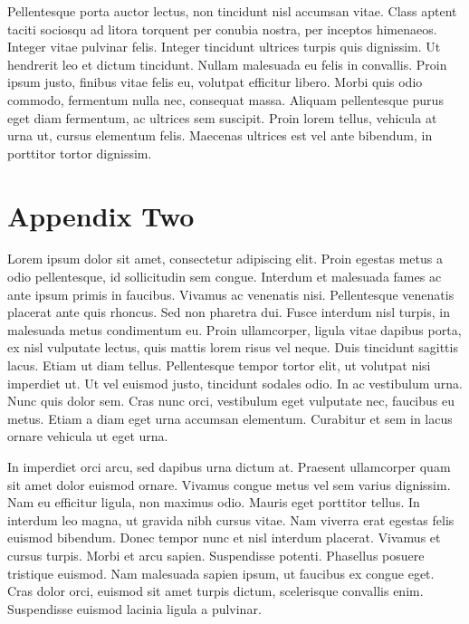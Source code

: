 \documentclass[12pt]{article}
\begin{document}
Pellentesque porta auctor lectus, non tincidunt nisl accumsan vitae. Class aptent taciti sociosqu ad litora torquent per conubia nostra, per inceptos himenaeos. Integer vitae pulvinar felis. Integer tincidunt ultrices turpis quis dignissim. Ut hendrerit leo et dictum tincidunt. Nullam malesuada eu felis in convallis. Proin ipsum justo, finibus vitae felis eu, volutpat efficitur libero. Morbi quis odio commodo, fermentum nulla nec, consequat massa. Aliquam pellentesque purus eget diam fermentum, ac ultrices sem suscipit. Proin lorem tellus, vehicula at urna ut, cursus elementum felis. Maecenas ultrices est vel ante bibendum, in porttitor tortor dignissim.



\newpage
\section{Appendix Two
\label{sec:appendix:two}}
\renewcommand{\thetable}{C\arabic{table}}
\setcounter{table}{0}
\renewcommand{\thefigure}{C\arabic{figure}}
\setcounter{figure}{0}

Lorem ipsum dolor sit amet, consectetur adipiscing elit. Proin egestas metus a odio pellentesque, id sollicitudin sem congue. Interdum et malesuada fames ac ante ipsum primis in faucibus. Vivamus ac venenatis nisi. Pellentesque venenatis placerat ante quis rhoncus. Sed non pharetra dui. Fusce interdum nisl turpis, in malesuada metus condimentum eu. Proin ullamcorper, ligula vitae dapibus porta, ex nisl vulputate lectus, quis mattis lorem risus vel neque. Duis tincidunt sagittis lacus. Etiam ut diam tellus. Pellentesque tempor tortor elit, ut volutpat nisi imperdiet ut. Ut vel euismod justo, tincidunt sodales odio. In ac vestibulum urna. Nunc quis dolor sem. Cras nunc orci, vestibulum eget vulputate nec, faucibus eu metus. Etiam a diam eget urna accumsan elementum. Curabitur et sem in lacus ornare vehicula ut eget urna.

In imperdiet orci arcu, sed dapibus urna dictum at. Praesent ullamcorper quam sit amet dolor euismod ornare. Vivamus congue metus vel sem varius dignissim. Nam eu efficitur ligula, non maximus odio. Mauris eget porttitor tellus. In interdum leo magna, ut gravida nibh cursus vitae. Nam viverra erat egestas felis euismod bibendum. Donec tempor nunc et nisl interdum placerat. Vivamus et cursus turpis. Morbi et arcu sapien. Suspendisse potenti. Phasellus posuere tristique euismod. Nam malesuada sapien ipsum, ut faucibus ex congue eget. Cras dolor orci, euismod sit amet turpis dictum, scelerisque convallis enim. Suspendisse euismod lacinia ligula a pulvinar.
\end{document}
